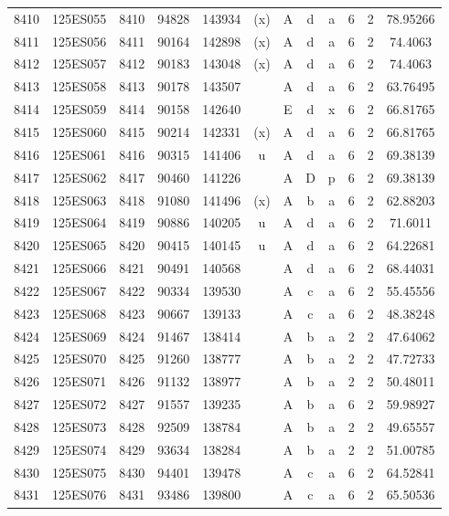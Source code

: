 \begin{tabular}{|*{12}{c|}}
8410 & 125ES055 & 8410 & 94828 & 143934 & (x) & A & d & a & 6 & 2 & 78.95266 \\ 
8411 & 125ES056 & 8411 & 90164 & 142898 & (x) & A & d & a & 6 & 2 & 74.4063 \\ 
8412 & 125ES057 & 8412 & 90183 & 143048 & (x) & A & d & a & 6 & 2 & 74.4063 \\ 
8413 & 125ES058 & 8413 & 90178 & 143507 &  & A & d & a & 6 & 2 & 63.76495 \\ 
8414 & 125ES059 & 8414 & 90158 & 142640 &  & E & d & x & 6 & 2 & 66.81765 \\ 
8415 & 125ES060 & 8415 & 90214 & 142331 & (x) & A & d & a & 6 & 2 & 66.81765 \\ 
8416 & 125ES061 & 8416 & 90315 & 141406 & u & A & d & a & 6 & 2 & 69.38139 \\ 
8417 & 125ES062 & 8417 & 90460 & 141226 &  & A & D & p & 6 & 2 & 69.38139 \\ 
8418 & 125ES063 & 8418 & 91080 & 141496 & (x) & A & b & a & 6 & 2 & 62.88203 \\ 
8419 & 125ES064 & 8419 & 90886 & 140205 & u & A & d & a & 6 & 2 & 71.6011 \\ 
8420 & 125ES065 & 8420 & 90415 & 140145 & u & A & d & a & 6 & 2 & 64.22681 \\ 
8421 & 125ES066 & 8421 & 90491 & 140568 &  & A & d & a & 6 & 2 & 68.44031 \\ 
8422 & 125ES067 & 8422 & 90334 & 139530 &  & A & c & a & 6 & 2 & 55.45556 \\ 
8423 & 125ES068 & 8423 & 90667 & 139133 &  & A & c & a & 6 & 2 & 48.38248 \\ 
8424 & 125ES069 & 8424 & 91467 & 138414 &  & A & b & a & 2 & 2 & 47.64062 \\ 
8425 & 125ES070 & 8425 & 91260 & 138777 &  & A & b & a & 2 & 2 & 47.72733 \\ 
8426 & 125ES071 & 8426 & 91132 & 138977 &  & A & b & a & 2 & 2 & 50.48011 \\ 
8427 & 125ES072 & 8427 & 91557 & 139235 &  & A & b & a & 6 & 2 & 59.98927 \\ 
8428 & 125ES073 & 8428 & 92509 & 138784 &  & A & b & a & 2 & 2 & 49.65557 \\ 
8429 & 125ES074 & 8429 & 93634 & 138284 &  & A & b & a & 2 & 2 & 51.00785 \\ 
8430 & 125ES075 & 8430 & 94401 & 139478 &  & A & c & a & 6 & 2 & 64.52841 \\ 
8431 & 125ES076 & 8431 & 93486 & 139800 &  & A & c & a & 6 & 2 & 65.50536 \\ 

\end{tabular}
